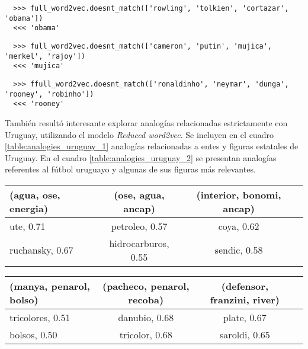 \begin{lstlisting}
  >>> full_word2vec.doesnt_match(['rowling', 'tolkien', 'cortazar', 'obama'])
  <<< 'obama'
\end{lstlisting}

\begin{lstlisting}
  >>> full_word2vec.doesnt_match(['cameron', 'putin', 'mujica', 'merkel', 'rajoy'])
  <<< 'mujica'
\end{lstlisting}

\begin{lstlisting}
  >>> ffull_word2vec.doesnt_match(['ronaldinho', 'neymar', 'dunga', 'rooney', 'robinho'])
  <<< 'rooney'
\end{lstlisting}

También resultó interesante explorar analogías relacionadas estrictamente con Uruguay,
utilizando el modelo \textit{Reduced word2vec}. Se incluyen en el cuadro
\ref{table:analogies_uruguay_1} analogías relacionadas a entes y figuras estatales de
Uruguay. En el cuadro \ref{table:analogies_uruguay_2} se presentan analogías referentes
al fútbol uruguayo y algunas de sus figuras más relevantes.

\begin{table*}[ht]
    \centering
    \begin{tabular}{lccc}
        \hline
        (agua, ose, energia) & (ose, agua, ancap) & (interior, bonomi, ancap)\\
        \hline
        ute, 0.71 & petroleo, 0.57 & coya, 0.62\\
        ruchansky, 0.67 & hidrocarburos, 0.55 & sendic, 0.58\\
        \hline
    \end{tabular}
    \caption{Analogías relacionadas a entes públicos uruguayos.}
    \label{table:analogies_uruguay_1}
\end{table*}

\begin{table*}[ht]
    \centering
    \begin{tabular}{lccc}
        \hline
        (manya, penarol, bolso) & (pacheco, penarol, recoba) & (defensor, franzini, river)\\
        \hline
        tricolores, 0.51 & danubio, 0.68 & plate, 0.67\\
        bolsos, 0.50 & tricolor, 0.68 & saroldi, 0.65\\
        \hline
    \end{tabular}
    \caption{Analogías relacionadas al fútbol uruguayo.}
    \label{table:analogies_uruguay_2}
\end{table*}


